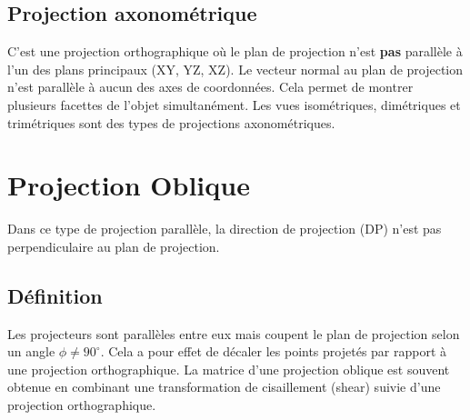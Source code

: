 \subsection{Projection axonométrique}
C'est une projection orthographique où le plan de projection n'est \textbf{pas} parallèle à l'un des plans principaux (XY, YZ, XZ). Le vecteur normal au plan de projection n'est parallèle à aucun des axes de coordonnées. Cela permet de montrer plusieurs facettes de l'objet simultanément. Les vues isométriques, dimétriques et trimétriques sont des types de projections axonométriques.
\section{Projection Oblique}
Dans ce type de projection parallèle, la direction de projection (DP) n'est pas perpendiculaire au plan de projection.
\subsection{Définition}
Les projecteurs sont parallèles entre eux mais coupent le plan de projection selon un angle \( \phi \neq 90^\circ \). Cela a pour effet de décaler les points projetés par rapport à une projection orthographique.
La matrice d'une projection oblique est souvent obtenue en combinant une transformation de cisaillement (shear) suivie d'une projection orthographique.
